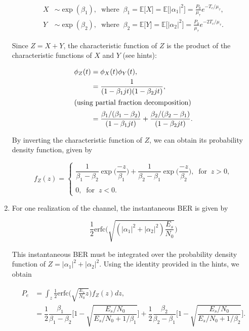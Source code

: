 \documentclass [a4paper, 11pt] {article}
\begin{document}
\begin{solution}
\begin{enumerate}
\begin{align}
    X &\sim \exp(\beta_1), \; \; \text{where} \; \; \beta_1 = \mathbb{E}\big[X\big] = \mathbb{E}\big[|\alpha_1|^2\big] = \frac{P_0}{\mu_\tau}e^{-T_c/\mu_\tau},\\
    Y &\sim \exp(\beta_2), \; \; \text{where} \; \; \beta_2 = \mathbb{E}\big[Y\big] = \mathbb{E}\big[|\alpha_2|^2\big] = \frac{P_0}{\mu_\tau}e^{-2T_c/\mu_\tau}.
\end{align}

Since $Z = X + Y$, the characteristic function of $Z$ is the product of the characteristic functions of $X$ and $Y$ (see hints): 

\begin{align}
\phi_Z(t) &= \phi_X(t)\phi_Y(t),\\
&= \dfrac{1}{(1-\beta_1 jt)(1-\beta_2 jt)},\\ \intertext{(using partial fraction decomposition)}
&= \dfrac{\beta_1/(\beta_1-\beta_2)}{(1-\beta_1 jt)} + \dfrac{\beta_2/(\beta_2-\beta_1)}{(1-\beta_2 jt)}.
\end{align}

By inverting the characteristic function of $Z$, we can obtain its probability density function, given by 

\begin{equation}
    f_Z(z)=\left\{
                \begin{array}{ll}
                  \dfrac{1}{\beta_1-\beta_2}\exp\Big( \dfrac{-z}{\beta_1}\Big) + \dfrac{1}{\beta_2-\beta_1}\exp\Big( \dfrac{-z}{\beta_2}\Big),\; \; \text{for} \; \; z > 0, \\
                  \\
                0, \; \; \text{for} \; \; z < 0.
                \end{array}
              \right.
\end{equation}
  
\item For one realization of the channel, the instantaneous BER is given by 

\begin{equation}
    \frac{1}{2}\text{erfc}\Bigg(\sqrt{(|\alpha_1|^2+|\alpha_2|^2) \frac{E_s}{N_0}}\Bigg)
\end{equation}

This instantaneous BER must be integrated over the probability density function of $Z = |\alpha_1|^2+|\alpha_2|^2$. Using the identity provided in the hints, we obtain 

\begin{align}
    P_e &= \int_{z}\frac{1}{2}\text{erfc}\Bigg(\sqrt{\frac{E_s}{N_0}z}\Bigg)f_Z(z) dz,\\
    &= \dfrac{1}{2}\dfrac{\beta_1}{\beta_1-\beta_2}\Bigg[ 1 - \sqrt{\dfrac{E_s/N_0}{E_s/N_0 + 1/\beta_1}} \Bigg] + \dfrac{1}{2}\dfrac{\beta_2}{\beta_2-\beta_1}\Bigg[ 1 - \sqrt{\dfrac{E_s/N_0}{E_s/N_0 + 1/\beta_2}} \Bigg].
\end{align}


\end{enumerate}
\end{solution}
\end{document}
